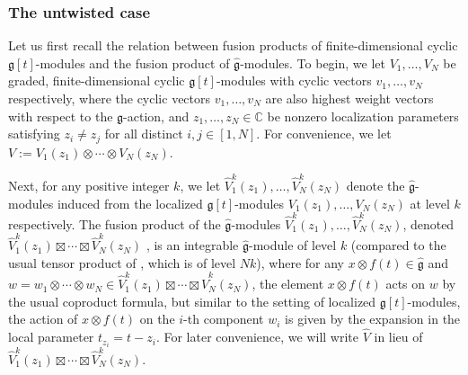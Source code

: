 \documentclass[10pt,a4paper]{amsart}
\numberwithin{equation}{section}
\begin{document}
\subsubsection{The untwisted case}\label{Section 3.1.1}

Let us first recall the relation between fusion products of finite-dimensional cyclic $\mathfrak{g}[t]$-modules and the fusion product of $\widehat{\mathfrak{g}}$-modules. To begin, we let $V_1,\dots,V_N$ be graded, finite-dimensional cyclic $\mathfrak{g}[t]$-modules with cyclic vectors $v_1,\dots,v_N$ respectively, where the cyclic vectors $v_1,\dots,v_N$ are also highest weight vectors with respect to the $\mathfrak{g}$-action, and $z_1,\dots,z_N\in \mathbb{C}$ be nonzero localization parameters satisfying $z_i\neq z_j$ for all distinct $i,j\in[1,N]$. For convenience, we let~${V:=V_1(z_1)\otimes\cdots\otimes V_N(z_N)}$.

Next, for any positive integer $k$, we let $\widehat{V}_1^k(z_1),\dots,\widehat{V}_N^k(z_N)$ denote the $\widehat{\mathfrak{g}}$-modules induced from the localized $\mathfrak{g}[t]$-modules $V_1(z_1),\dots,V_N(z_N)$ at level $k$ respectively. The fusion product of the $\widehat{\mathfrak{g}}$-modules $\widehat{V}_1^k(z_1),\dots ,\widehat{V}_N^k(z_N)$, denoted $\widehat{V}_1^k(z_1)\boxtimes \cdots\boxtimes\widehat{V}_N^k(z_N)$ \cite{FJKLM04}, is an integrable $\widehat{\mathfrak{g}}$-module of level $k$ (compared to the usual tensor product  of , which is of level $Nk$), where for any $x\otimes f(t)\in \widehat{\mathfrak{g}}$ and
$
w=w_1\otimes\cdots\otimes w_N\in\widehat{V}_1^k(z_1)\boxtimes\cdots\boxtimes\widehat{V}_N^k(z_N)$,
 the element $x\otimes f(t)$ acts on $w$ by the usual coproduct formula, but similar to the setting of localized $\mathfrak{g}[t]$-modules, the action of $x\otimes f(t)$ on the $i$-th component $w_i$ is given by the expansion in the local parameter $t_{z_i}=t-z_i$. For later convenience, we will write $\widehat{V}$ in lieu of~${\widehat{V}_1^k(z_1) \boxtimes\cdots\boxtimes\widehat{V}_N^k(z_N)}$.
\end{document}
